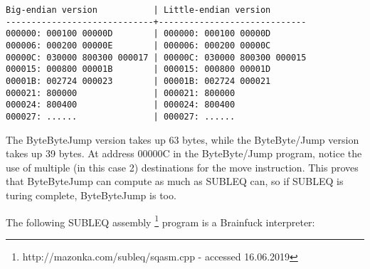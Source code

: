 \documentclass{article}
\begin{document}
\begin{verbatim}
Big-endian version           | Little-endian version
-----------------------------+-----------------------------
000000: 000100 00000D        | 000000: 000100 00000D
000006: 000200 00000E        | 000006: 000200 00000C
00000C: 030000 800300 000017 | 00000C: 030000 800300 000015
000015: 000800 00001B        | 000015: 000800 00001D
00001B: 002724 000023        | 00001B: 002724 000021
000021: 800000               | 000021: 800000
000024: 800400               | 000024: 800400
000027: ......               | 000027: ......
\end{verbatim}

\par The ByteByteJump version takes up 63 bytes, while the ByteByte/Jump version takes up 39 bytes. At address 00000C in the ByteByte/Jump program, notice the use of multiple (in this case 2) destinations for the move instruction. This proves that ByteByteJump can compute as much as SUBLEQ can, so if SUBLEQ is turing complete, ByteByteJump is too.

\par The following SUBLEQ assembly \footnote{http://mazonka.com/subleq/sqasm.cpp - accessed 16.06.2019} program is a Brainfuck interpreter:
\end{document}
